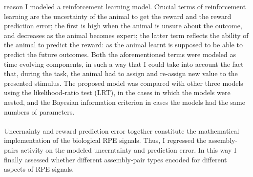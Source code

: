 reason I modeled a reinforcement learning model. Crucial terms of reinforcement learning are the uncertainty of the animal to get the reward and the reward prediction error; the first is high when the animal is unsure about the outcome, and decreases as the animal becomes expert; the latter term reflects the ability of the animal to predict the reward: as the animal learnt is supposed to be able to predict the future outcomes. Both the aforementioned terms were modeled as time evolving components, in such a way that I could take into account the fact that, during the task, the animal had to assign and re-assign new value to the presented stimulus. The proposed model was compared with other three models using the likelihood-ratio test (LRT), in the cases in which the models were nested, and the Bayesian information criterion in cases the models had the same numbers of parameters.\\\\Uncernainty and reward prediction error together constitute the mathematical implementation of the biological RPE signals. Thus, I regressed the assembly-pairs activity on the modeled uncerntainty and prediction error. In this way I finally assessed whether different assembly-pair types encoded for different aspects of RPE signals.

